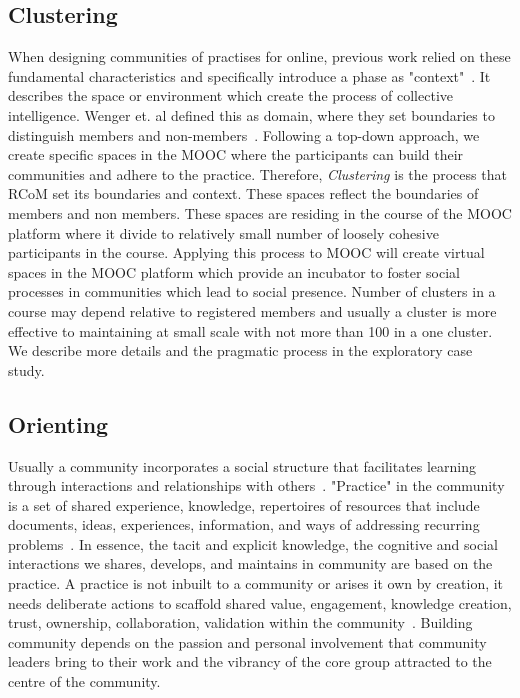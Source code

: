 \documentclass[format=acmsmall, review=false, screen=true]{acmart}
\begin{document}
\subsection{Clustering} 
When designing communities of practises for online, previous work relied on these fundamental characteristics and specifically introduce a phase as "context"~\cite{gunawardena2009theoretical}. It describes the space or environment which create the process of collective intelligence. Wenger et. al defined this as domain, where they set boundaries to distinguish members and non-members~\cite{wenger2010communities}. Following a top-down approach, we create specific spaces in the MOOC where the participants can build their communities and adhere to the practice. Therefore, \textit{Clustering} is the process that RCoM set its boundaries and context. These spaces reflect the boundaries of members and non members. These spaces are residing in the course of the MOOC platform where it divide to relatively small number of loosely cohesive participants in the course. Applying this process to MOOC will create virtual spaces in the MOOC platform which provide an incubator to foster social processes in communities which lead to social presence. Number of clusters in a course may depend relative to registered members and usually a cluster is more effective to maintaining at small scale with not more than 100 in a one cluster. We describe more details and the pragmatic process in the exploratory case study. 

\subsection{Orienting} 
Usually a community incorporates a social structure that facilitates learning through interactions and relationships with others~\cite{wenger2001harvard}. "Practice" in the community is a set of shared experience, knowledge, repertoires of resources that include documents, ideas, experiences, information, and ways of addressing recurring problems~\cite{wenger2001harvard}. In essence, the tacit and explicit knowledge, the cognitive and social interactions we shares, develops, and maintains in community are based on the practice. A practice is not inbuilt to a community or arises it own by creation, it needs deliberate actions to scaffold shared value, engagement, knowledge creation, trust, ownership, collaboration, validation within the community~\cite{liu2009community}. Building community depends on the passion and personal involvement that community leaders bring to their work and the vibrancy of the core group attracted to the centre of the community. 
\end{document}
